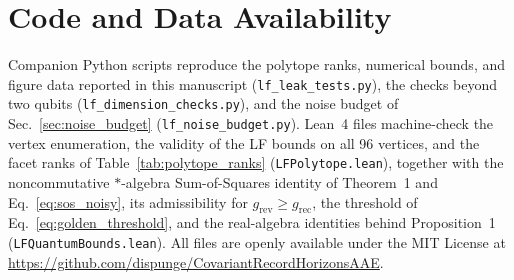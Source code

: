 \section*{Code and Data Availability}
Companion Python scripts reproduce the polytope ranks, numerical bounds, and figure data reported in this manuscript (\texttt{lf\_leak\_tests.py}), the checks beyond two qubits (\texttt{lf\_dimension\_checks.py}), and the noise budget of Sec.~\ref{sec:noise_budget} (\texttt{lf\_noise\_budget.py}). Lean~4 files machine-check the vertex enumeration, the validity of the LF bounds on all 96 vertices, and the facet ranks of Table~\ref{tab:polytope_ranks} (\texttt{LFPolytope.lean}), together with the noncommutative $*$-algebra Sum-of-Squares identity of Theorem~1 and Eq.~\eqref{eq:sos_noisy}, its admissibility for $g_{\mathrm{rev}} \ge g_{\mathrm{rec}}$, the threshold of Eq.~\eqref{eq:golden_threshold}, and the real-algebra identities behind Proposition~1 (\texttt{LFQuantumBounds.lean}). All files are openly available under the MIT License at \url{https://github.com/dispunge/CovariantRecordHorizonsAAE}.
